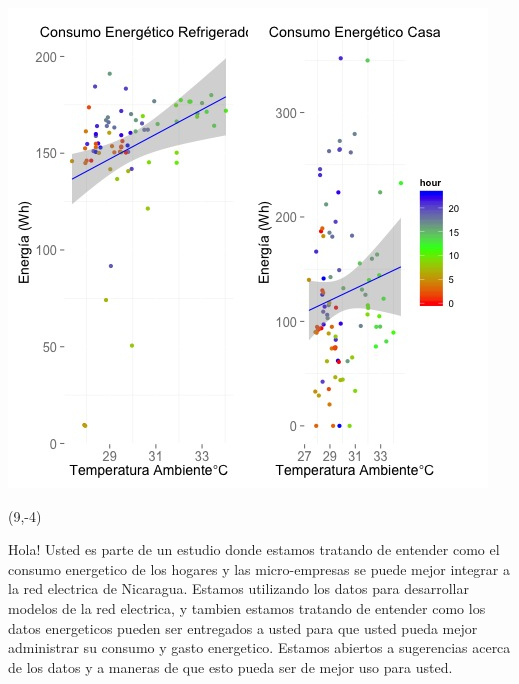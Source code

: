 \documentclass{article}\usepackage[]{graphicx}\usepackage[]{color}
\newenvironment{knitrout}{}{} %
\begin{document}
\begin{knitrout}
\color{fgcolor}
\includegraphics[scale=0.75]{figure/A7_correlaciones} 
\end{knitrout}

 \begin{textblock}{1}(9,-4)
\begin{minipage}{20em}
\begingroup

\endgroup
\end{minipage}
\end{textblock}

\vspace{70px}
\begin{knitrout}
Hola! Usted es parte de un estudio donde estamos tratando de entender como el consumo energetico de los hogares y las micro-empresas se puede mejor integrar a la red electrica de Nicaragua. Estamos utilizando los datos para desarrollar modelos de la red electrica, y tambien estamos tratando de entender como los datos energeticos pueden ser entregados a usted para que usted pueda mejor administrar su consumo y gasto energetico.  Estamos abiertos a sugerencias acerca de los datos y a maneras de que esto pueda ser de mejor uso para usted.
\end{knitrout}
\end{document}
